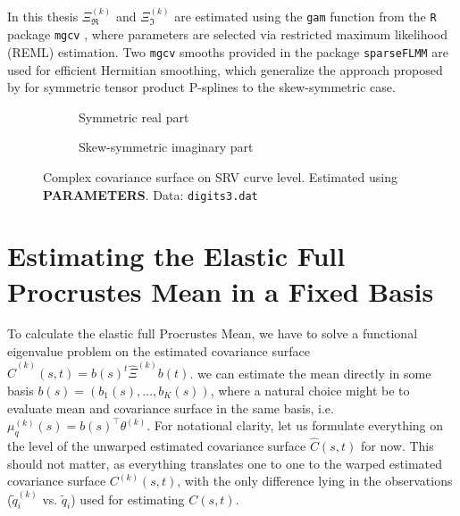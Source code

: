 In this thesis  $\Xi^{(k)}_\Re$ and $\Xi^{(k)}_\Im$ are estimated using the \texttt{gam} function from the \texttt{R} package \texttt{mgcv} \parencite{Wood2017}, where parameters are selected via restricted maximum likelihood (REML) estimation.
Two \texttt{mgcv} smooths provided in the package \texttt{sparseFLMM} \parencite{sparseFLMM} are used for efficient Hermitian smoothing, which generalize the approach proposed by \cite{CederbaumScheiplGreven2018} for symmetric tensor product P-splines to the skew-symmetric case.

\begin{figure}
  \centering
  \begin{subfigure}{.48\textwidth}
    \centering
    \caption{Symmetric real part}
  \end{subfigure}\hfill%
  \begin{subfigure}{.48\textwidth}
    \centering
    \caption{Skew-symmetric imaginary part}
  \end{subfigure}
  \caption{Complex covariance surface on SRV curve level. Estimated using \textbf{PARAMETERS}. Data: \texttt{digits3.dat}}
  \label{fig:3-cov}
\end{figure}


\section{Estimating the Elastic Full Procrustes Mean in a Fixed Basis}
\label{sec:3-mean}
To calculate the elastic full Procrustes Mean, we have to solve a functional eigenvalue problem on the estimated covariance surface $\hat{C}^{(k)}(s,t) = b(s)^t \hat\Xi^{(k)} b(t)$.
we can estimate the mean directly in some basis $b(s) = (b_1(s),\dots,b_K(s))$, where a natural choice might be to evaluate mean and covariance surface in the same basis, i.e. $\mu^{(k)}_q(s) = b(s)^\top \theta^{(k)}$.
For notational clarity, let us formulate everything on the level of the unwarped estimated covariance surface $\hat{C}(s,t)$ for now.
This should not matter, as everything translates one to one to the warped estimated covariance surface $C^{(k)}(s,t)$, with the only difference lying in the observations ($\widetilde q^{(k)}_i$ vs. $\widetilde q_i$) used for estimating $C(s,t)$.


